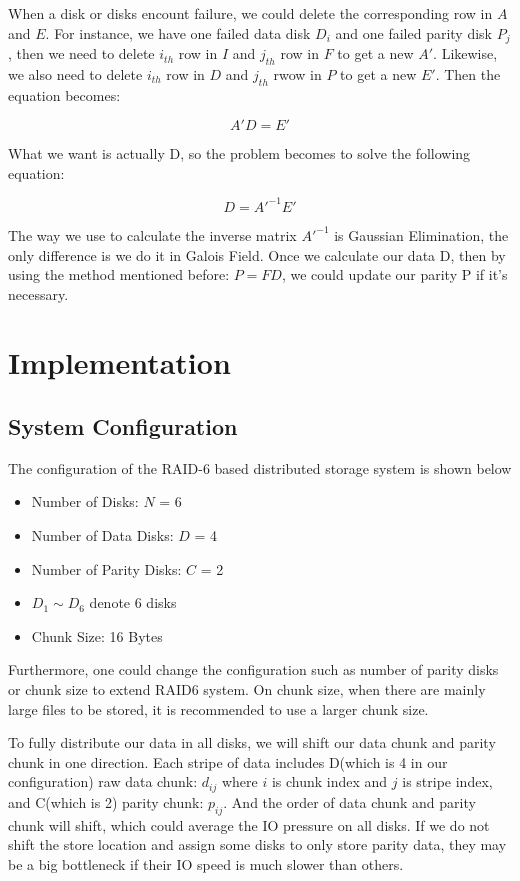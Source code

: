 \documentclass[journal]{IEEEtran}
\begin{document}
When a disk or disks encount failure, we could delete the corresponding row in $A$ and $E$. For instance, we have one failed data disk $D_i$ and one failed parity disk $P_j$, then we need to delete $i_{th}$ row in $I$ and $j_{th}$ row in $F$ to get a new $A'$. Likewise, we also need to delete $i_{th}$ row in $D$ and $j_{th}$ rwow in $P$ to get a new $E'$. Then the equation becomes: 

\begin{equation}
A'D=E'
\end{equation}

What we want is actually D, so the problem becomes to solve the following equation:

\begin{equation}
D=A'^{-1}E'
\end{equation}

The way we use to calculate the inverse matrix $A'^{-1}$ is Gaussian Elimination, the only difference is we do it in Galois Field. Once we calculate our data D, then by using the method mentioned before: $P=FD$, we could update our parity P if it's necessary. 

\section{ Implementation}
\label{sec4}

\subsection{System Configuration}
The configuration of the RAID-6 based distributed storage system is shown below
\begin{itemize}
	\item Number of Disks: $N$ = 6
	\item Number of Data Disks: $D$ = 4
	\item Number of Parity Disks: $C$ = 2
	\item $D_1 \sim D_6$ denote 6 disks
	\item Chunk Size: 16 Bytes
\end{itemize}

Furthermore, one could change the configuration such as number of parity disks or chunk size to extend RAID6 system. On chunk size, when there are mainly large files to be stored, it is recommended to use a larger chunk size.

To fully distribute our data in all disks, we will shift our data chunk and parity chunk in one direction. Each stripe of data includes D(which is 4 in our configuration) raw data chunk: $d_{ij}$ where $i$ is chunk index and $j$ is stripe index, and C(which is 2) parity chunk: $p_{ij}$. And the order of data chunk and parity chunk will shift, which could average the IO pressure on all disks. If we do not shift the store location and assign some disks to only store parity data, they may be a big bottleneck if their IO speed is much slower than others.
\end{document}
